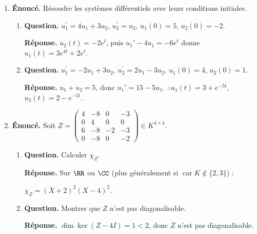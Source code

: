 \documentclass[12pt, a4paper]{article}
\begin{document}
\begin{enumerate}[label=9.\arabic*., start=94]
\begin{minipage}[t]{\linewidth}
\begin{enumerate}[\arabic*.]
\end{enumerate}
\end{minipage}

  \item \begin{minipage}[t]{\linewidth}\raggedright
\textbf{Énoncé.} Résoudre les systèmes différentiels avec leurs conditions initiales.

\begin{enumerate}[\arabic*.]
        \item \textbf{Question.} $u_1^{\prime}=4u_1+3u_2$, $u_2^{\prime}=u_2$, $u_1(0)=5$, $u_2(0)=-2$.
\par\smallskip
\textbf{Réponse.} $u_2(t)=-2e^t$, puis $u_1'-4u_1=-6e^t$ donne
        $u_1(t)=3e^{4t}+2e^t$.

  \item \textbf{Question.} $u_1^{\prime}=-2u_1+3u_2$, $u_2^{\prime}=2u_1-3u_2$, $u_1(0)=4$, $u_2(0)=1$.
\par\smallskip
\textbf{Réponse.} $u_1+u_2=5$, donc $u_1'=15-5u_1$.
        $\therefore u_1(t)=3+e^{-5t}$, $u_2(t)=2-e^{-5t}$.

\end{enumerate}
\end{minipage}

  \item \begin{minipage}[t]{\linewidth}\raggedright
\textbf{Énoncé.} Soit $\displaystyle Z=\begin{pmatrix}4&-8&0&-3\\0&4&0&0\\6&-8&-2&-3\\0&-8&0&-2\end{pmatrix}\in K^{4\times4}$.

\begin{enumerate}[\arabic*.]
        \item \textbf{Question.} Calculer $\chi_Z$.
\par\smallskip
\textbf{Réponse.} Sur $\RR$ ou $\CC$ (plus généralement si $\operatorname{car}K\notin\{2,3\}$) :

$\chi_Z=(X+2)^2(X-4)^2$.

  \item \textbf{Question.} Montrer que $Z$ n’est pas diagonalisable.
\par\smallskip
\textbf{Réponse.} $\dim\ker(Z-4I)=1<2$, donc $Z$ n'est pas diagonalisable.


\end{enumerate}
\end{minipage}
\end{enumerate}
\end{document}
